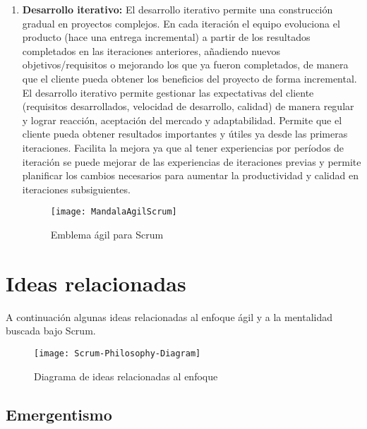 \begin{enumerate}
\item \textbf{Desarrollo iterativo:} El desarrollo iterativo permite una construcción gradual en proyectos complejos. En cada iteración el equipo evoluciona el producto (hace una entrega incremental) a partir de los resultados completados en las iteraciones anteriores, añadiendo nuevos objetivos/requisitos o mejorando los que ya fueron completados, de manera que el cliente pueda obtener los beneficios del proyecto de forma incremental. El desarrollo iterativo permite gestionar las expectativas del cliente (requisitos desarrollados, velocidad de desarrollo, calidad) de manera regular y lograr reacción, aceptación del mercado y adaptabilidad. Permite que el cliente pueda obtener resultados importantes y útiles ya desde las primeras iteraciones. Facilita la mejora ya que al tener experiencias por períodos de iteración se puede mejorar de las experiencias de iteraciones previas y permite planificar los cambios necesarios para aumentar la productividad y calidad en iteraciones subsiguientes.

\begin{figure}[h]
  \centering
  \texttt{[image: MandalaAgilScrum]}
  \caption{Emblema ágil para Scrum}
  \centering
  \label{fig:MandalaAgilScrum} %
\end{figure}

\end{enumerate}

\section{Ideas relacionadas}

A continuación algunas ideas relacionadas al enfoque ágil y a la mentalidad buscada bajo Scrum.

\begin{figure}[h] 
  \centering
  \texttt{[image: Scrum-Philosophy-Diagram]}
  \caption{Diagrama de ideas relacionadas al enfoque}
  \centering
  \label{fig:Scrum-Philosophy-Diagram} %
\end{figure}
\FloatBarrier %


\subsection{Emergentismo}

